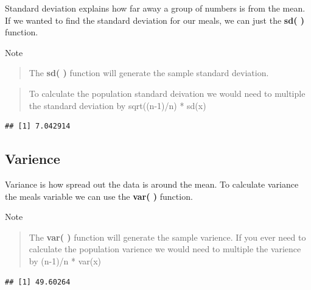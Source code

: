 \documentclass[
]{book}
\newenvironment{Shaded}{\begin{snugshade}}{\end{snugshade}}
\newcommand{\FunctionTok}[1]{\textcolor[rgb]{0.00,0.00,0.00}{#1}}
\newcommand{\NormalTok}[1]{#1}
\newcommand{\SpecialCharTok}[1]{\textcolor[rgb]{0.00,0.00,0.00}{#1}}
\begin{document}
Standard deviation explains how far away a group of numbers is from the mean. If we wanted to find the standard deviation for our meals, we can just the \textbf{sd( )} function.

Note

\begin{quote}
The \textbf{sd( )} function will generate the sample standard deviation.
\end{quote}

\begin{quote}
To calculate the population standard deivation we would need to multiple the standard deviation by sqrt((n-1)/n) * sd(x)
\end{quote}

\begin{Shaded}
\end{Shaded}

\begin{verbatim}
## [1] 7.042914
\end{verbatim}

\hypertarget{varience}{%
\subsection{Varience}\label{varience}}

Variance is how spread out the data is around the mean. To calculate variance the meals variable we can use the \textbf{var( )} function.

Note

\begin{quote}
The \textbf{var( )} function will generate the sample varience.
If you ever need to calculate the population varience we would need to multiple the varience by (n-1)/n * var(x)
\end{quote}

\begin{Shaded}
\end{Shaded}

\begin{verbatim}
## [1] 49.60264
\end{verbatim}
\end{document}
